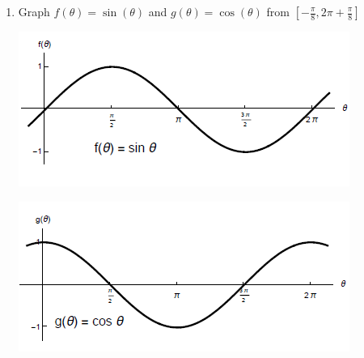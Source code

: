 \documentclass[nooutcomes]{ximera}
\begin{document}
\begin{problem} \hfil

\begin{enumerate}
	\item Graph $f(\theta)=\sin(\theta)$ and $g(\theta)=\cos(\theta)$ from $[-\frac{\pi}{8},2\pi+\frac{\pi}{8}]$
		\begin{freeResponse} \hfil
		\begin{image}
		\includegraphics{figure8.png}
		\end{image}
		\begin{image}
		\includegraphics{figure9.png}
		\end{image}
		\end{freeResponse}


\end{enumerate}
\end{problem}
\end{document}
